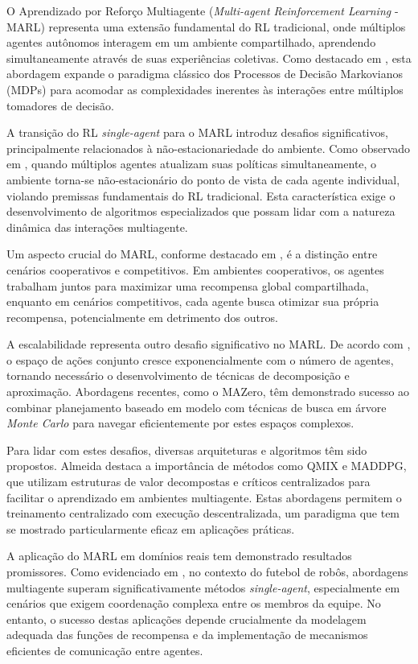 O Aprendizado por Reforço Multiagente (\textit{Multi-agent Reinforcement Learning} - MARL) representa uma extensão fundamental do RL tradicional, onde múltiplos agentes autônomos interagem em um ambiente compartilhado, aprendendo simultaneamente através de suas experiências coletivas. Como destacado em \cite{bruno_brandao}, esta abordagem expande o paradigma clássico dos Processos de Decisão Markovianos (MDPs) para acomodar as complexidades inerentes às interações entre múltiplos tomadores de decisão.

A transição do RL \textit{single-agent} para o MARL introduz desafios significativos, principalmente relacionados à não-estacionariedade do ambiente. Como observado em \cite{seac_multiagent}, quando múltiplos agentes atualizam suas políticas simultaneamente, o ambiente torna-se não-estacionário do ponto de vista de cada agente individual, violando premissas fundamentais do RL tradicional. Esta característica exige o desenvolvimento de algoritmos especializados que possam lidar com a natureza dinâmica das interações multiagente.

Um aspecto crucial do MARL, conforme destacado em \cite{review_cooperative_multi_agent}, é a distinção entre cenários cooperativos e competitivos. Em ambientes cooperativos, os agentes trabalham juntos para maximizar uma recompensa global compartilhada, enquanto em cenários competitivos, cada agente busca otimizar sua própria recompensa, potencialmente em detrimento dos outros.

A escalabilidade representa outro desafio significativo no MARL. De acordo com \citet{efficient_multi_agent}, o espaço de ações conjunto cresce exponencialmente com o número de agentes, tornando necessário o desenvolvimento de técnicas de decomposição e aproximação. Abordagens recentes, como o MAZero, têm demonstrado sucesso ao combinar planejamento baseado em modelo com técnicas de busca em árvore \textit{Monte Carlo} para navegar eficientemente por estes espaços complexos.

Para lidar com estes desafios, diversas arquiteturas e algoritmos têm sido propostos. Almeida \cite{agentes_inteligentes_puc} destaca a importância de métodos como QMIX e MADDPG, que utilizam estruturas de valor decompostas e críticos centralizados para facilitar o aprendizado em ambientes multiagente. Estas abordagens permitem o treinamento centralizado com execução descentralizada, um paradigma que tem se mostrado particularmente eficaz em aplicações práticas.

A aplicação do MARL em domínios reais tem demonstrado resultados promissores. Como evidenciado em \cite{martins_vss}, no contexto do futebol de robôs, abordagens multiagente superam significativamente métodos \textit{single-agent}, especialmente em cenários que exigem coordenação complexa entre os membros da equipe. No entanto, o sucesso destas aplicações depende crucialmente da modelagem adequada das funções de recompensa e da implementação de mecanismos eficientes de comunicação entre agentes.

